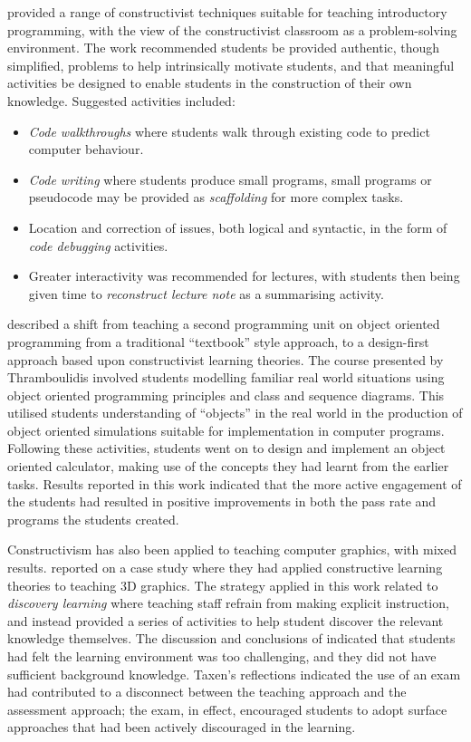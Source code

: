 \citet{VanGorp:2001} provided a range of constructivist techniques suitable for teaching introductory programming, with the view of the constructivist classroom as a problem-solving environment. The work recommended students be provided authentic, though simplified, problems to help intrinsically motivate students, and that meaningful activities be designed to enable students in the construction of their own knowledge. Suggested activities included:

\begin{itemize}[noitemsep,nolistsep]
	\item \emph{Code walkthroughs} where students walk through existing code to predict computer behaviour.
	\item \emph{Code writing} where students produce small programs, small programs or pseudocode may be provided as \emph{scaffolding} for more complex tasks. 
	\item Location and correction of issues, both logical and syntactic, in the form of \emph{code debugging} activities.
	\item Greater interactivity was recommended for lectures, with students then being given time to \emph{reconstruct lecture note} as a summarising activity. 
\end{itemize}


\citet{Thramboulidis:2003,Thramboulidis:2003a,Thramboulidis:2003b} described a shift from teaching a second programming unit on object oriented programming from a traditional ``textbook'' style approach, to a design-first approach based upon constructivist learning theories. The course presented by Thramboulidis involved students modelling familiar real world situations using object oriented programming principles and class and sequence diagrams. This utilised students understanding of ``objects'' in the real world in the production of object oriented simulations suitable for implementation in computer programs. Following these activities, students went on to design and implement an object oriented calculator, making use of the concepts they had learnt from the earlier tasks. Results reported in this work indicated that the more active engagement of the students had resulted in positive improvements in both the pass rate and programs the students created. 

Constructivism has also been applied to teaching computer graphics, with mixed results. \citet{Taxen:2004} reported on a case study where they had applied constructive learning theories to teaching 3D graphics. The strategy applied in this work related to \emph{discovery learning} \cite{Duffy:1996} where teaching staff refrain from making explicit instruction, and instead provided a series of activities to help student discover the relevant knowledge themselves. The discussion and conclusions of \citet{Taxen:2004} indicated that students had felt the learning environment was too challenging, and they did not have sufficient background knowledge. Taxen's reflections indicated the use of an exam had contributed to a disconnect between the teaching approach and the assessment approach; the exam, in effect, encouraged students to adopt surface approaches that had been actively discouraged in the learning.

